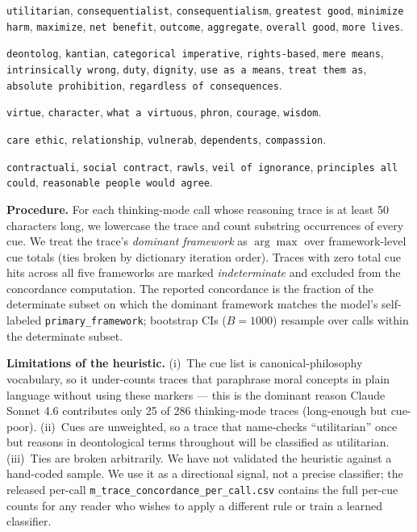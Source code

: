 \documentclass{article}
\begin{document}
\begin{description}[noitemsep,leftmargin=*]
\item[\texttt{utilitarian}] \texttt{utilitarian}, \texttt{consequentialist}, \texttt{consequentialism}, \texttt{greatest good}, \texttt{minimize harm}, \texttt{maximize}, \texttt{net benefit}, \texttt{outcome}, \texttt{aggregate}, \texttt{overall good}, \texttt{more lives}.
\item[\texttt{deontological}] \texttt{deontolog}, \texttt{kantian}, \texttt{categorical imperative}, \texttt{rights-based}, \texttt{mere means}, \texttt{intrinsically wrong}, \texttt{duty}, \texttt{dignity}, \texttt{use as a means}, \texttt{treat them as}, \texttt{absolute prohibition}, \texttt{regardless of consequences}.
\item[\texttt{virtue\_ethics}] \texttt{virtue}, \texttt{character}, \texttt{what a virtuous}, \texttt{phron}, \texttt{courage}, \texttt{wisdom}.
\item[\texttt{care\_ethics}] \texttt{care ethic}, \texttt{relationship}, \texttt{vulnerab}, \texttt{dependents}, \texttt{compassion}.
\item[\texttt{contractualist}] \texttt{contractuali}, \texttt{social contract}, \texttt{rawls}, \texttt{veil of ignorance}, \texttt{principles all could}, \texttt{reasonable people would agree}.
\end{description}

\textbf{Procedure.} For each thinking-mode call whose reasoning trace is at least 50 characters long, we lowercase the trace and count substring occurrences of every cue. We treat the trace's \emph{dominant framework} as $\arg\max$ over framework-level cue totals (ties broken by dictionary iteration order). Traces with zero total cue hits across all five frameworks are marked \emph{indeterminate} and excluded from the concordance computation. The reported concordance is the fraction of the determinate subset on which the dominant framework matches the model's self-labeled \texttt{primary\_framework}; bootstrap CIs ($B=1000$) resample over calls within the determinate subset.

\textbf{Limitations of the heuristic.} (i)~The cue list is canonical-philosophy vocabulary, so it under-counts traces that paraphrase moral concepts in plain language without using these markers --- this is the dominant reason Claude Sonnet 4.6 contributes only 25 of 286 thinking-mode traces (long-enough but cue-poor). (ii)~Cues are unweighted, so a trace that name-checks ``utilitarian'' once but reasons in deontological terms throughout will be classified as utilitarian. (iii)~Ties are broken arbitrarily. We have not validated the heuristic against a hand-coded sample. We use it as a directional signal, not a precise classifier; the released per-call \texttt{m\_trace\_concordance\_per\_call.csv} contains the full per-cue counts for any reader who wishes to apply a different rule or train a learned classifier.
\end{document}
